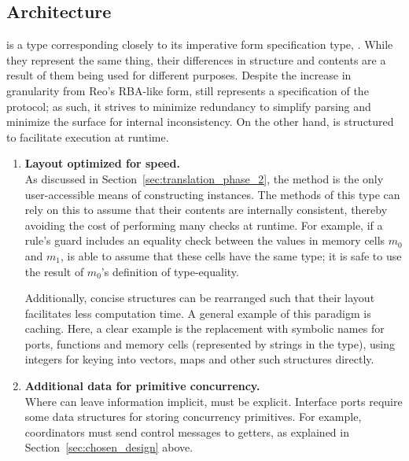 \subsection{Architecture}
\label{sec:protocol_object_architecture}
 is a type corresponding closely to its imperative form specification type, . While they represent the same thing, their differences in structure and contents are a result of them being used for different purposes. Despite the increase in granularity from Reo's RBA-like form,  still represents a specification of the protocol; as such, it strives to minimize redundancy to simplify parsing and minimize the surface for internal inconsistency. On the other hand,  is structured to facilitate execution at runtime.

\begin{enumerate}
	\item \textbf{Layout optimized for speed.}\\
	As discussed in Section~\ref{sec:translation_phase_2}, the  method is the only user-accessible means of constructing  instances. The methods of this type can rely on this to assume that their contents are internally consistent, thereby avoiding the cost of performing many checks at runtime. For example, if a rule's guard includes an equality check between the values in memory cells $m_0$ and $m_1$,  is able to assume that these cells have the same type; it is safe to use the result of $m_0$'s definition of type-equality.
	
	Additionally, concise structures can be rearranged such that their layout facilitates less computation time. A general example of this paradigm is caching. Here, a clear example is the replacement with symbolic names for ports, functions and memory cells (represented by strings in the  type), using integers for keying into vectors, maps and other such structures directly.
	
	\item \textbf{Additional data for primitive concurrency.}\\
	Where  can leave information implicit,  must be explicit. Interface ports require some data structures for storing concurrency primitives. For example, coordinators must send control messages to getters, as explained in Section~\ref{sec:chosen_design} above. 
\end{enumerate}

